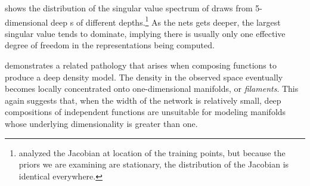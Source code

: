 %
 shows the distribution of the singular value spectrum of draws from 5-dimensional deep \gp{}s of different depths.\footnote{\citet{rifai2011contractive} analyzed the Jacobian at location of the training points, but because the priors we are examining are stationary, the distribution of the Jacobian is identical everywhere.}
As the nets gets deeper, the largest singular value tends to dominate, implying there is usually only one effective degree of freedom in the representations being computed.

 demonstrates a related pathology that arises when composing functions to produce a deep density model.
The density in the observed space eventually becomes locally concentrated onto one-dimensional manifolds, or \emph{filaments}.
This again suggests that, when the width of the network is relatively small, deep compositions of independent functions are unsuitable for modeling manifolds whose underlying dimensionality is greater than one.

